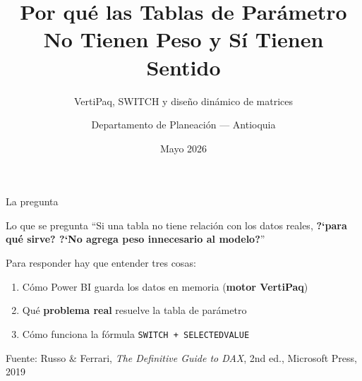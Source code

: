 \documentclass[aspectratio=169,10pt]{beamer}
\title[Tablas de Par\'ametro en Power BI]%
      {Por qu\'e las Tablas de Par\'ametro\\No Tienen Peso y S\'i Tienen Sentido}
\subtitle{VertiPaq, SWITCH y dise\~no din\'amico de matrices}
\author{Departamento de Planeaci\'on --- Antioquia}
\date{Mayo 2026}
\newcommand{\src}[1]{{\tiny\color{gray}Fuente: #1}}
\begin{document}
\begin{frame}
\titlepage
\end{frame}

\begin{frame}{La pregunta}

\begin{alertblock}{Lo que se pregunta}
``Si una tabla no tiene relaci\'on con los datos reales,
\textbf{?`para qu\'e sirve?
?`No agrega peso innecesario al modelo?}''
\end{alertblock}

\bigskip
Para responder hay que entender tres cosas:

\begin{enumerate}
  \item C\'omo Power BI guarda los datos en memoria (\textbf{motor VertiPaq})
  \item Qu\'e \textbf{problema real} resuelve la tabla de par\'ametro
  \item C\'omo funciona la f\'ormula \texttt{SWITCH + SELECTEDVALUE}
\end{enumerate}

\bigskip
\src{Russo \& Ferrari, \textit{The Definitive Guide to DAX}, 2nd ed., Microsoft Press, 2019}

\end{frame}
\end{document}
